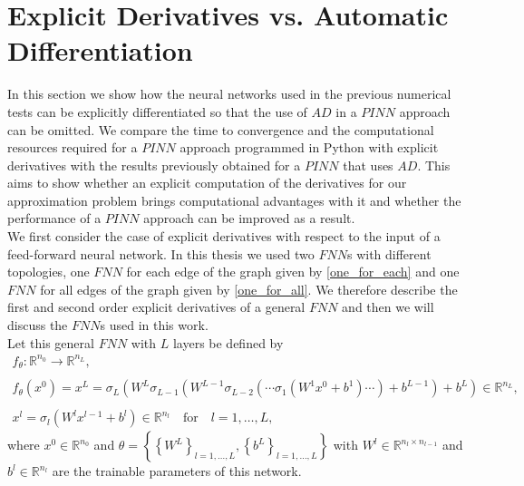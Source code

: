 \section{Explicit Derivatives vs. Automatic Differentiation}
\label{ch3:sec3}

In this section we show how the neural networks used in the previous numerical tests can be explicitly differentiated so that the use of $AD$ in a $PINN$ approach can be omitted. We compare the time to convergence and the computational resources required for a $PINN$ approach programmed in Python with explicit derivatives with the results previously obtained for a $PINN$ that uses $AD$. This aims to show whether an explicit computation of the derivatives for our approximation problem brings computational advantages with it and whether the performance of a $PINN$ approach can be improved as a result. \\
We first consider the case of explicit derivatives with respect to the input of a feed-forward neural network. In this thesis we used two $FNN$s with different topologies, one $FNN$ for each edge of the graph given by \cref{one_for_each} and one $FNN$ for all edges of the graph given by \cref{one_for_all}. We therefore describe the first and second order explicit derivatives of a general $FNN$ and then we will discuss the $FNN$s used in this work. \\
Let this general $FNN$ with $L$ layers be defined by 
\begin{equation} 
    \label{model prediction}
    \begin{gathered}
        f_{\theta} \colon \mathbb{R}^{n_0} \to \mathbb{R}^{n_L}, \\
        \\
        f_{\theta}\left(x^0\right) = x^L = \sigma_L\left(W^L \sigma_{L-1}\left(W^{L-1}\sigma_{L-2}\left(\cdots \sigma_{1}\left(W^{1}x^0 + b^1\right) \cdots\right) + b^{L-1}\right) + b^{L}\right) \in \mathbb{R}^{n_L}, \\
        \\
        x^l = \sigma_l\left(W^l x^{l-1} + b^l\right) \in \mathbb{R}^{n_l} \quad \text{for} \quad l = 1, \ldots, L,
    \end{gathered} 
\end{equation} 
where $x^0 \in \mathbb{R}^{n_0}$ and $\theta = \left\{ \left\{ W^L \right\}_{l = 1, \ldots, L}, \left\{ b^L \right\}_{l = 1, \ldots, L} \right\}$ with $W^l \in \mathbb{R}^{n_l \times n_{l-1}}$ and $b^l \in \mathbb{R}^{n_l}$ are the trainable parameters of this network. \\
